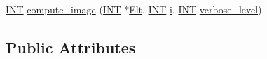 \begin{DoxyCompactItemize}
\item 
\mbox{\hyperlink{galois_8h_a09fddde158a3a20bd2dcadb609de11dc}{I\+NT}} \mbox{\hyperlink{classaction__on__cosets_a6c64ec61d7a0443041ca04ec17791dbd}{compute\+\_\+image}} (\mbox{\hyperlink{galois_8h_a09fddde158a3a20bd2dcadb609de11dc}{I\+NT}} $\ast$\mbox{\hyperlink{simeon_8_c_aec1406935bdb1fee3561fcb840964100}{Elt}}, \mbox{\hyperlink{galois_8h_a09fddde158a3a20bd2dcadb609de11dc}{I\+NT}} \mbox{\hyperlink{alphabet2_8_c_acb559820d9ca11295b4500f179ef6392}{i}}, \mbox{\hyperlink{galois_8h_a09fddde158a3a20bd2dcadb609de11dc}{I\+NT}} \mbox{\hyperlink{simeon_8_c_a818073fbcc2f439e7c56952f67386122}{verbose\+\_\+level}})
\end{DoxyCompactItemize}
\subsection*{Public Attributes}
